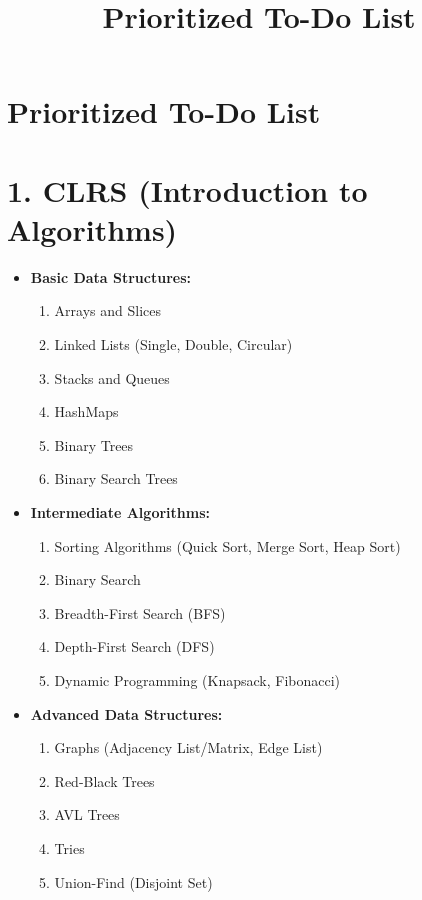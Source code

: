 \documentclass{article}
\title{Prioritized To-Do List}
\date{}
\begin{document}
\maketitle

\section*{Prioritized To-Do List}

\section*{1. CLRS (Introduction to Algorithms)}
\begin{itemize}
    \item \textbf{Basic Data Structures:}
    \begin{enumerate}
        \item Arrays and Slices
        \item Linked Lists (Single, Double, Circular)
        \item Stacks and Queues
        \item HashMaps
        \item Binary Trees
        \item Binary Search Trees
    \end{enumerate}
    
    \item \textbf{Intermediate Algorithms:}
    \begin{enumerate}
        \item Sorting Algorithms (Quick Sort, Merge Sort, Heap Sort)
        \item Binary Search
        \item Breadth-First Search (BFS)
        \item Depth-First Search (DFS)
        \item Dynamic Programming (Knapsack, Fibonacci)
    \end{enumerate}
    
    \item \textbf{Advanced Data Structures:}
    \begin{enumerate}
        \item Graphs (Adjacency List/Matrix, Edge List)
        \item Red-Black Trees
        \item AVL Trees
        \item Tries
        \item Union-Find (Disjoint Set)
    \end{enumerate}
    

\end{itemize}
\end{document}
